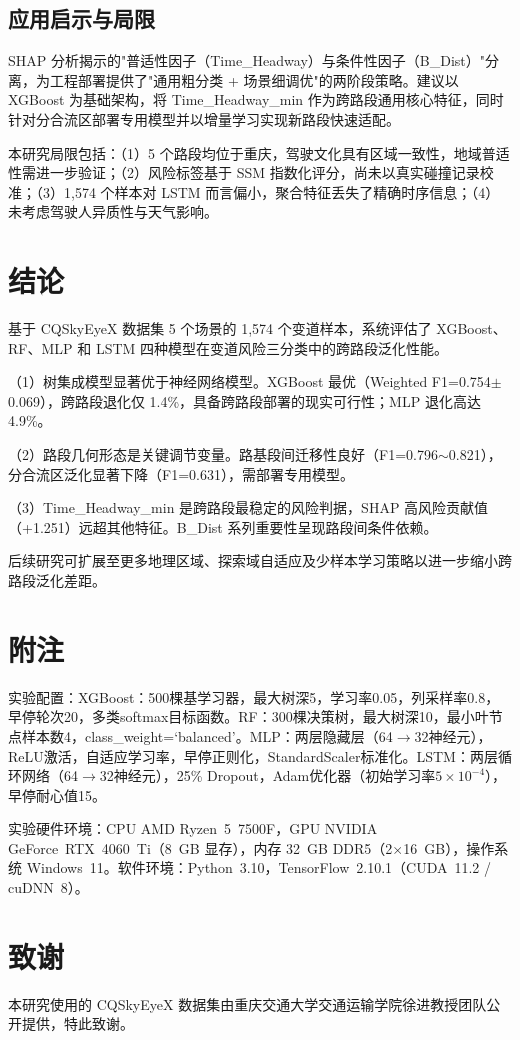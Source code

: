 \documentclass[preprint,review,12pt,a4paper]{elsarticle}
\begin{document}
\subsection{应用启示与局限}

SHAP 分析揭示的"普适性因子（Time\_Headway）与条件性因子（B\_Dist）"分离，为工程部署提供了"通用粗分类 + 场景细调优"的两阶段策略。建议以 XGBoost 为基础架构，将 Time\_Headway\_min 作为跨路段通用核心特征，同时针对分合流区部署专用模型并以增量学习实现新路段快速适配。

本研究局限包括：（1）5 个路段均位于重庆，驾驶文化具有区域一致性，地域普适性需进一步验证；（2）风险标签基于 SSM 指数化评分，尚未以真实碰撞记录校准；（3）1,574 个样本对 LSTM 而言偏小，聚合特征丢失了精确时序信息；（4）未考虑驾驶人异质性与天气影响。

\section{结论}

基于 CQSkyEyeX 数据集 5 个场景的 1,574 个变道样本，系统评估了 XGBoost、RF、MLP 和 LSTM 四种模型在变道风险三分类中的跨路段泛化性能。

（1）树集成模型显著优于神经网络模型。XGBoost 最优（Weighted F1=0.754$\pm$0.069），跨路段退化仅 1.4\%，具备跨路段部署的现实可行性；MLP 退化高达 4.9\%。

（2）路段几何形态是关键调节变量。路基段间迁移性良好（F1=0.796$\sim$0.821），分合流区泛化显著下降（F1=0.631），需部署专用模型。

（3）Time\_Headway\_min 是跨路段最稳定的风险判据，SHAP 高风险贡献值（+1.251）远超其他特征。B\_Dist 系列重要性呈现路段间条件依赖。

后续研究可扩展至更多地理区域、探索域自适应及少样本学习策略以进一步缩小跨路段泛化差距。

\appendix
\section{附注}
实验配置：XGBoost：500棵基学习器，最大树深5，学习率0.05，列采样率0.8，早停轮次20，多类softmax目标函数。RF：300棵决策树，最大树深10，最小叶节点样本数4，class\_weight=`balanced'。MLP：两层隐藏层（64$\to$32神经元），ReLU激活，自适应学习率，早停正则化，StandardScaler标准化。LSTM：两层循环网络（64$\to$32神经元），25\% Dropout，Adam优化器（初始学习率$5\times10^{-4}$），早停耐心值15。

实验硬件环境：CPU AMD Ryzen~5~7500F，GPU NVIDIA GeForce~RTX~4060~Ti（8~GB 显存），内存 32~GB DDR5（2$\times$16~GB），操作系统 Windows~11。软件环境：Python~3.10，TensorFlow~2.10.1（CUDA~11.2 / cuDNN~8）。

\section*{致谢}
本研究使用的 CQSkyEyeX 数据集由重庆交通大学交通运输学院徐进教授团队公开提供\cite{C17}，特此致谢。



\end{document}

